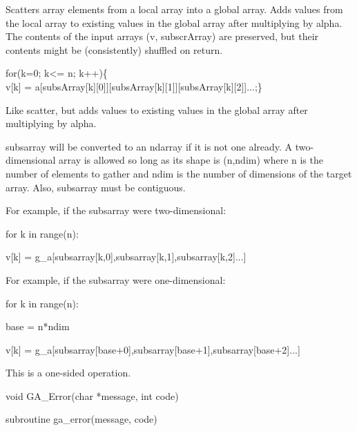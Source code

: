 \documentclass[12pt]{article}
\begin{document}
\begin{desc}

Scatters array elements from a local array into a global array. Adds 
values from the local array to existing values in the global array 
after multiplying by alpha. The contents of the input arrays (v, subscrArray) 
are preserved, but their contents might be (consistently) shuffled on return.
   
for(k=0; k<= n; k++)\{\\v[k] = a[subsArray[k][0]][subsArray[k][1]][subsArray[k][2]]...;\}\   

Like scatter, but adds values to existing values in the global array after 
multiplying by alpha.

subsarray will be converted to an ndarray if it is not one already. A 
two-dimensional array is allowed so long as its shape is (n,ndim) where n is 
the number of elements to gather and ndim is the number of dimensions of the 
target array. Also, subsarray must be contiguous.

For example, if the subsarray were two-dimensional:

for k in range(n):

    v[k] = g_a[subsarray[k,0],subsarray[k,1],subsarray[k,2]...]

For example, if the subsarray were one-dimensional:


for k in range(n):

    base = n*ndim

    v[k] = g_a[subsarray[base+0],subsarray[base+1],subsarray[base+2]...]

This is a one-sided operation.

\end{desc}


\begin{capi}
\begin{ccode}
void GA_Error(char *message, int code)
\end{ccode}
\begin{funcargs}
\end{funcargs}
\end{capi}
\begin{fapi}
\begin{fcode}
subroutine ga_error(message, code)
\end{fcode}
\begin{funcargs}
\end{funcargs}
\end{fapi}
\end{document}
